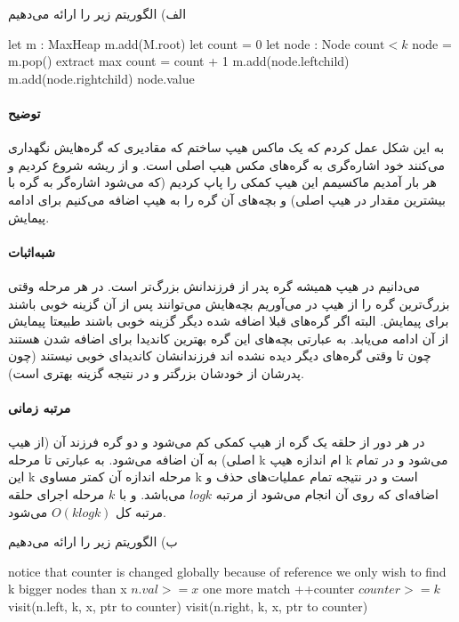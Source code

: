 الف)
الگوریتم زیر را ارائه می‌دهیم

\begin{latin}
\begin{codebox}
		\li let m : MaxHeap
		\li m.add(M.root)
		\li let count = 0
		\li let node : Node
		\li \While $\text{count} < k$ \Then
			\li node = m.pop() \Comment extract max
			\li count = count + 1
			\li m.add(node.leftchild)
			\li m.add(node.rightchild)
		\End
		\li \Return node.value
	\End
\end{codebox}
\end{latin}

\paragraph{توضیح}
به این شکل عمل کردم که یک ماکس هیپ ساختم که مقادیری که گره‌هایش نگهداری می‌کنند خود اشاره‌گری به گره‌های مکس هیپ اصلی است. و از ریشه شروع کردیم و هر بار آمدیم ماکسیمم این هیپ کمکی را پاپ کردیم (که می‌شود اشاره‌گر به گره با بیشترین مقدار در هیپ اصلی) و بچه‌های آن گره را به هیپ اضافه می‌کنیم برای ادامه پیمایش.

\paragraph{شبه‌اثبات}
می‌دانیم در هیپ همیشه گره پدر از فرزندانش بزرگ‌تر است. در هر مرحله وقتی بزرگ‌ترین گره را از هیپ در می‌آوریم بچه‌هایش می‌توانند پس از آن گزینه خوبی باشند برای پیمایش. البته اگر گره‌های قبلا اضافه شده دیگر گزینه خوبی باشند طبیعتا پیمایش از آن ادامه می‌یابد.
به عبارتی بچه‌های
این گره بهترین کاندیدا برای اضافه شدن هستند چون تا وقتی گره‌های دیگر دیده نشده اند فرزندانشان کاندیدای خوبی نیستند (چون پدرشان از خودشان بزرگتر و در نتیجه گزینه بهتری است).

\paragraph{مرتبه زمانی}
در هر دور از حلقه یک گره از هیپ کمکی کم می‌شود و دو گره فرزند آن (از هیپ اصلی) به آن اضافه می‌شود. به عبارتی تا مرحله 
k
ام اندازه هیپ k 
می‌شود و در تمام این k مرحله اندازه آن 
کمتر مساوی 
k 
است و در نتیجه تمام عملیا‌ت‌های حذف و اضافه‌ای که روی آن انجام می‌شود
از مرتبه 
$log k$
می‌باشد.
و با  
$k$
مرحله اجرای حلقه مرتبه کل 
$O(klogk)$
می‌شود.
 

ب)
الگوریتم زیر را ارائه می‌دهیم

\begin{latin}
\begin{codebox}
	\li \Comment notice that counter is changed globally because of reference
	\li \Comment we only wish to find k bigger nodes than x
	\li	\If $n.val >= x$ \Then 
	\li \Return \End
	\li \Comment one more match
	\li ++counter
	\li \If $counter >= k$ \Then 
	\li \Return \End
	\li visit(n.left, k, x, ptr to counter)
	\li visit(n.right, k, x, ptr to counter)
	\End
\end{codebox}
\end{latin}


